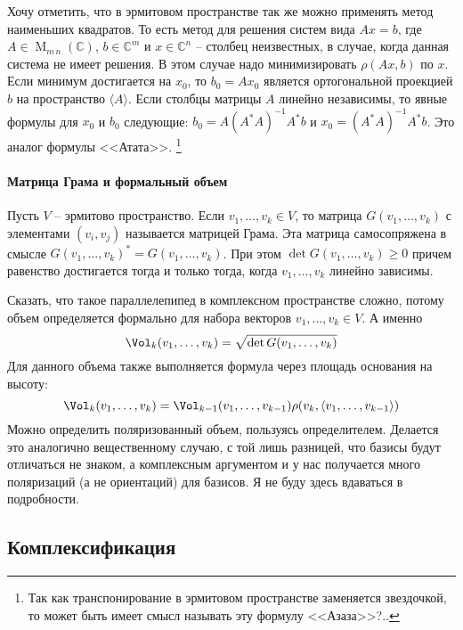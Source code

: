 Хочу отметить, что в эрмитовом пространстве так же можно применять метод наименьших квадратов.
То есть метод для решения систем вида $Ax = b$, где $A\in \operatorname{M}_{m\,n}(\mathbb C)$, $b\in \mathbb C^m$ и $x\in\mathbb C^n$ -- столбец неизвестных, в случае, когда данная система не имеет решения.
В этом случае надо минимизировать $\rho(Ax, b)$ по $x$.
Если минимум достигается на $x_0$, то $b_0 = Ax_0$ является ортогональной проекцией $b$ на пространство $\langle A \rangle$.
Если столбцы матрицы $A$ линейно независимы, то явные формулы для $x_0$ и $b_0$ следующие: $b_0 = A(A^*A)^{-1}A^*b$ и $x_0 = (A^*A)^{-1}A^*b$.
Это аналог формулы <<Атата>>.%
\footnote{Так как транспонирование в эрмитовом пространстве заменяется звездочкой, то может быть имеет смысл называть эту формулу <<Азаза>>?..}

\paragraph{Матрица Грама и формальный объем}

Пусть $V$ -- эрмитово пространство.
Если $v_1,\ldots,v_k\in V$, то матрица $G(v_1,\ldots,v_k)$ с элементами $(v_i, v_j)$ называется матрицей Грама.
Эта матрица самосопряжена в смысле $G(v_1,\ldots,v_k)^* = G(v_1,\ldots,v_k)$.
При этом $\det G(v_1,\ldots,v_k)\geqslant 0$ причем равенство достигается тогда и только тогда, когда $v_1,\ldots,v_k$ линейно зависимы.

Сказать, что такое параллелепипед в комплексном пространстве сложно, потому объем определяется формально для набора векторов $v_1,\ldots,v_k\in V$.
А именно
\[
\Vol_k(v_1,\ldots,v_k) = \sqrt{\det G(v_1,\ldots,v_k)}
\]
Для данного объема также выполняется формула через площадь основания на высоту:
\[
\Vol_k(v_1,\ldots,v_k) = \Vol_{k-1}(v_1,\ldots,v_{k-1}) \rho(v_k, \langle v_1,\ldots,v_{k-1}\rangle)
\]
Можно определить поляризованный объем, пользуясь определителем.
Делается это аналогично вещественному случаю, с той лишь разницей, что базисы будут отличаться  не знаком, а комплексным аргументом и у нас получается много поляризаций (а не ориентаций) для базисов.
Я не буду здесь вдаваться в подробности.

\subsection{Комплексификация}


